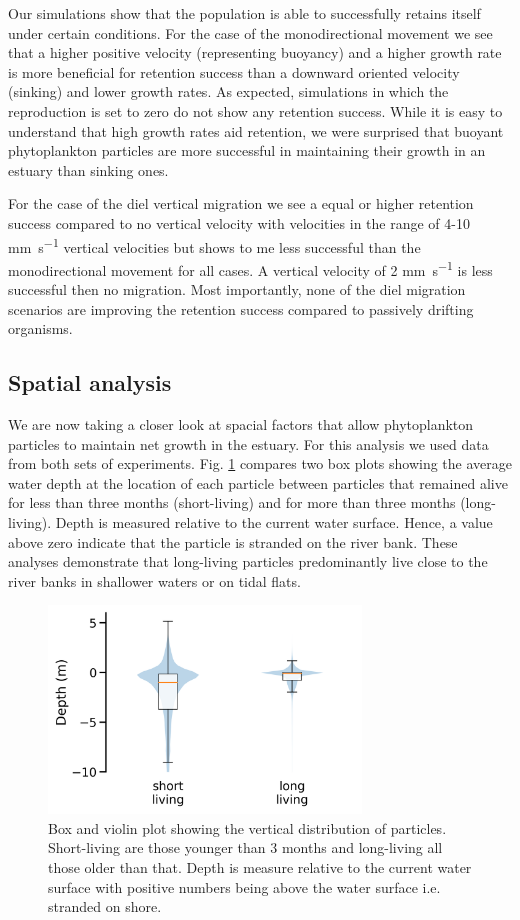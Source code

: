\documentclass[npg, manuscript]{copernicus}
\begin{document}
Our simulations show that the population is able to successfully retains itself under certain conditions. For the case of the monodirectional movement we see that a higher positive velocity (representing buoyancy) and a higher growth rate is more beneficial for retention success than a downward oriented velocity (sinking) and lower growth rates.
As expected, simulations in which the reproduction is set to zero do not show any retention success.
While it is easy to understand that high growth rates aid retention, we were surprised that buoyant phytoplankton particles are more successful in maintaining their growth in an estuary than sinking ones.

For the case of the diel vertical migration we see a equal or higher retention success compared to no vertical velocity with velocities in the range of 4-10 \unit{mm s^{-1}} vertical velocities but shows to me less successful than the monodirectional movement for all cases.
A vertical velocity of 2 \unit{mm s^{-1}} is less successful then no migration.
Most importantly, none of the diel migration scenarios are improving the retention success compared to passively drifting organisms.


\subsection{Spatial analysis}

We are now taking a closer look at spacial factors that allow phytoplankton particles to maintain net growth in the estuary. 
For this analysis we used data from both sets of experiments.
Fig. \ref{fig:migration-long-vs-short} compares two box plots showing the average water depth at the location of each particle between particles that remained alive for less than three months (short-living) and for more than three months (long-living).
Depth is measured relative to the current water surface.
Hence, a value above zero indicate that the particle is stranded on the river bank.
These analyses demonstrate that long-living particles predominantly live close to the river banks in shallower waters or on tidal flats.

\begin{figure}
    \includegraphics[width=8.3cm]{figures/retention_boxplot.png}
    \caption[]{Box and violin plot showing the vertical distribution of particles.  Short-living are those younger than 3 months and long-living all those older than that. Depth is measure relative to the current water surface with positive numbers being above the water surface i.e. stranded on shore.}
    \label{fig:migration-long-vs-short}
\end{figure}
\end{document}
